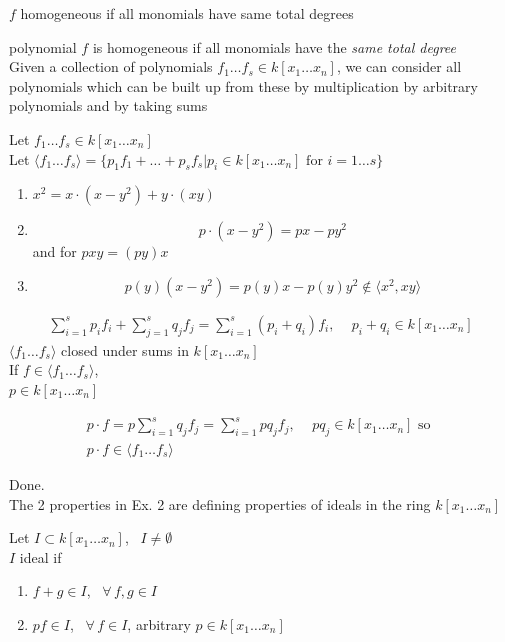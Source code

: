 $f$ homogeneous if all monomials have same total degrees

polynomial $f$ is homogeneous if all monomials have the \emph{same total degree} \\

Given a collection of polynomials $f_1 \dots f_s \in k[x_1 \dots x_n]$, we can consider all polynomials which can be built up from these by multiplication by arbitrary polynomials and by taking sums

\begin{definition}[1.3] Let $f_1 \dots f_s \in k[x_1 \dots x_n]$ \\
Let $\langle f_1 \dots f_s \rangle = \lbrace p_1 f_1  + \dots + p_s f_s | p_i \in k[x_1 \dots x_n] \text{ for } i = 1 \dots s \rbrace$
\end{definition}


\begin{enumerate}
\item[(a)] $x^2 = x \cdot ( x  -y^2 ) + y \cdot ( xy )$  
\item[(b)] 
\[
 p \cdot ( x - y^2 ) = p x - p y^2
\]
and for $p xy = (py)x$
\item[(c)] 
\[
p(y) ( x - y^2) = p(y)x - p(y) y^2 \notin \langle x^2, xy \rangle
\]
\end{enumerate}

\[
\begin{gathered}
  \sum_{i=1}^s p_i f_i  + \sum_{j=1}^s q_j f_j = \sum_{i=1}^s (p_i + q_i )f_i, \quad \, p_i + q_i \in k[x_1 \dots x_n] \end{gathered}
\]
$\langle f_1 \dots f_s \rangle$ closed under sums in $k[x_1 \dots x_n]$ \\

If $f\in \langle f_1 \dots f_s \rangle$, \\
\phantom{If }$ p \in k [x_1 \dots x_n]$

\[
\begin{gathered}
p\cdot f = p \sum_{i=1}^s q_j f_j = \sum_{i=1}^s pq_j f_j, \quad \, pq_j \in k[x_1 \dots x_n] \text{ so }  \\
p\cdot f \in \langle f_1 \dots f_s \rangle
\end{gathered}
\]

Done.  \\

The 2 properties in Ex. 2 are defining properties of ideals in the ring $k[x_1 \dots x_n]$

\begin{definition}[1.5]
Let $I \subset k[x_1 \dots x_n]$, \, $I \neq \emptyset$ \\
$I$ ideal if 
\begin{enumerate}
\item[(a)] $f+ g \in I$, \, $\forall \, f,g \in I$ 
\item[(b)] $pf \in I$, \, $\forall \, f \in I$, arbitrary $p \in k[x_1 \dots x_n]$
\end{enumerate}
\end{definition}

